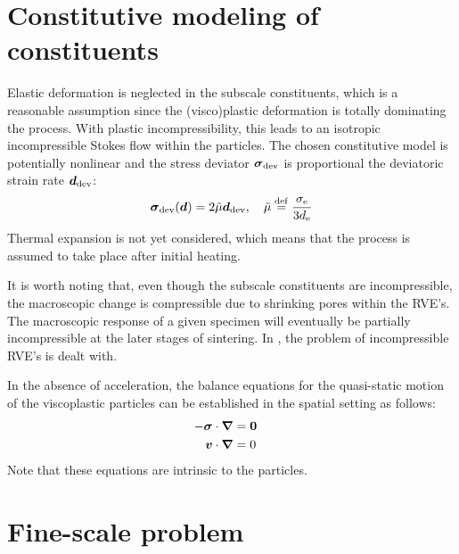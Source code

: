 \documentclass[ExampleMasters.tex]{subfiles}
\begin{document}
\section{Constitutive modeling of constituents}
Elastic deformation is neglected in the subscale constituents, which is a reasonable assumption since the (visco)plastic deformation is totally dominating the process.
With plastic incompressibility, this leads to an isotropic incompressible Stokes flow within the particles.
The chosen constitutive model is potentially nonlinear and the stress deviator $\boldsymbol{\sigma}_{\mathrm{dev}}$ is proportional the deviatoric strain rate $\boldsymbol{d}_{\mathrm{dev}}$:
\begin{equation}
    \boldsymbol{\sigma}_{\mathrm{dev}}(\boldsymbol{d}) = 2\tilde{\mu}\boldsymbol{d}_{\mathrm{dev}}, \quad
    \tilde{\mu}\overset{\mathrm{def}}{=} \frac{\sigma_{\mathrm{e}}}{3d_{\mathrm{e}}}
\end{equation}
Thermal expansion is not yet considered, which means that the process is assumed to take place after initial heating.

It is worth noting that, even though the subscale constituents are incompressible, the macroscopic change is compressible due to shrinking pores within the RVE's. The macroscopic response of a given specimen will eventually be partially incompressible at the later stages of sintering. 
In , the problem of incompressible RVE's is dealt with.

In the absence of acceleration, the balance equations for the quasi-static motion of the viscoplastic particles can be established in the spatial setting as follows:
\begin{subequations}\label{eq:stokesflow}
\begin{align}
    -\ts{\sigma}\cdot\diff & = \ts{0} \quad%
\label{eq:stokesflow_momentum}
\\
    \ta{v}\cdot\diff & = 0 \quad%
\label{eq:stokesflow_continuity}
\end{align}
\end{subequations}
Note that these equations are intrinsic to the particles.

\section{Fine-scale problem}
\end{document}
